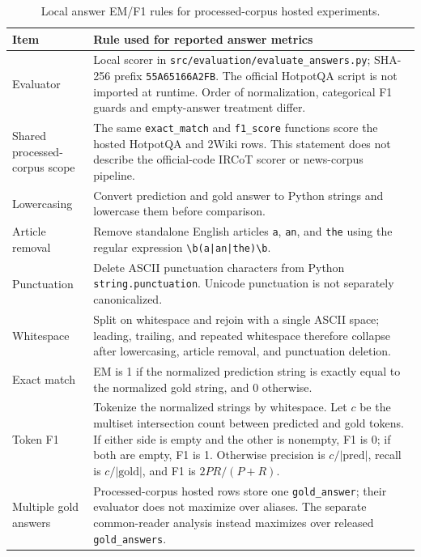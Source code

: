 \documentclass[pdflatex,sn-basic,Numbered]{sn-jnl}
\begin{document}
\begin{table}[t]
\centering
\caption{Local answer EM/F1 rules for processed-corpus hosted experiments.}
\label{tab:answer_metric_definition}
\scriptsize
\begin{threeparttable}
\setlength{\tabcolsep}{4pt}
\begin{tabularx}{\textwidth}{>{\raggedright\arraybackslash}p{}
                            >{\raggedright\arraybackslash}X}
\toprule
Item & Rule used for reported answer metrics \\
\midrule
Evaluator & Local scorer in \texttt{src/evaluation/evaluate\_answers.py}; SHA-256 prefix \texttt{55A65166A2FB}. The official HotpotQA script is not imported at runtime. Order of normalization, categorical F1 guards and empty-answer treatment differ. \\
Shared processed-corpus scope & The same \texttt{exact\_match} and \texttt{f1\_score} functions score the hosted HotpotQA and 2Wiki rows. This statement does not describe the official-code IRCoT scorer or news-corpus pipeline. \\
Lowercasing & Convert prediction and gold answer to Python strings and lowercase them before comparison. \\
Article removal & Remove standalone English articles \texttt{a}, \texttt{an}, and \texttt{the} using the regular expression \texttt{\textbackslash b(a|an|the)\textbackslash b}. \\
Punctuation & Delete ASCII punctuation characters from Python \texttt{string.punctuation}. Unicode punctuation is not separately canonicalized. \\
Whitespace & Split on whitespace and rejoin with a single ASCII space; leading, trailing, and repeated whitespace therefore collapse after lowercasing, article removal, and punctuation deletion. \\
Exact match & EM is 1 if the normalized prediction string is exactly equal to the normalized gold string, and 0 otherwise. \\
Token F1 & Tokenize the normalized strings by whitespace. Let $c$ be the multiset intersection count between predicted and gold tokens. If either side is empty and the other is nonempty, F1 is 0; if both are empty, F1 is 1. Otherwise precision is $c/|\mathrm{pred}|$, recall is $c/|\mathrm{gold}|$, and F1 is $2PR/(P+R)$. \\
Multiple gold answers & Processed-corpus hosted rows store one \texttt{gold\_answer}; their evaluator does not maximize over aliases. The separate common-reader analysis instead maximizes over released \texttt{gold\_answers}. \\

\end{tabularx}
\end{threeparttable}
\end{table}
\end{document}
